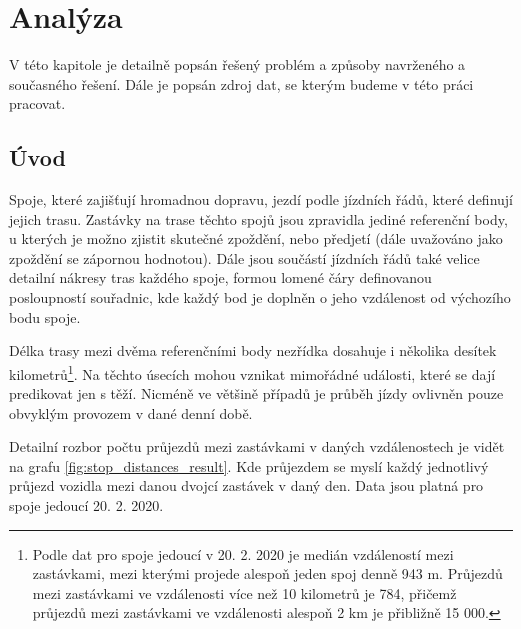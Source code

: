 
\chapter{Analýza}

V této kapitole je detailně popsán řešený problém a způsoby navrženého a současného řešení. Dále je popsán zdroj dat, se kterým budeme v této práci pracovat.

\section{Úvod}

Spoje, které zajišťují hromadnou dopravu, jezdí podle jízdních řádů, které definují jejich trasu. Zastávky na trase těchto spojů jsou zpravidla jediné referenční body, u kterých je možno zjistit skutečné zpoždění, nebo předjetí (dále uvažováno jako zpoždění se zápornou hodnotou). Dále jsou součástí jízdních řádů také velice detailní nákresy tras každého spoje, formou lomené čáry definovanou posloupností souřadnic, kde každý bod je doplněn o jeho vzdálenost od výchozího bodu spoje.

\bigbreak

Délka trasy mezi dvěma referenčními body nezřídka dosahuje i několika desítek kilometrů\footnote{Podle dat pro spoje jedoucí v 20. 2. 2020 je medián vzdáleností mezi zastávkami, mezi kterými projede alespoň jeden spoj denně 943 m. Průjezdů mezi zastávkami ve vzdálenosti více než 10 kilometrů je 784, přičemž průjezdů mezi zastávkami ve vzdálenosti alespoň 2 km je přibližně 15 000.}. Na těchto úsecích mohou vznikat mimořádné události, které se dají predikovat jen s těží. Nicméně ve většině případů je průběh jízdy ovlivněn pouze obvyklým provozem v dané denní době.

\bigbreak

Detailní rozbor počtu průjezdů mezi zastávkami v daných vzdálenostech je vidět na grafu \ref{fig:stop_distances_result}. Kde průjezdem se myslí každý jednotlivý průjezd vozidla mezi danou dvojcí zastávek v daný den. Data jsou platná pro spoje jedoucí 20. 2. 2020.

